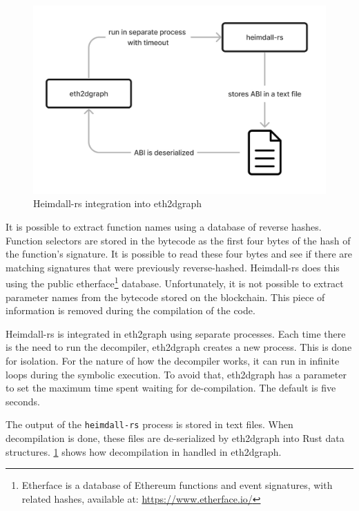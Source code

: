 \begin{figure}[!ht]
  \centering
  \includegraphics[width=1\textwidth]{Figures/methods/decompilation-architecture.jpg}
  \caption[Heimdall-rs integration into eth2dgraph]{Heimdall-rs integration into eth2dgraph}
  \label{fig:decompilation-architecture}
\end{figure}

It is possible to extract function names using a database of reverse hashes. Function selectors are stored in the bytecode as the first four bytes of the hash of the function's signature. It is possible to read these four bytes and see if there are matching signatures that were previously reverse-hashed. Heimdall-rs does this using the public etherface\footnote{Etherface is a database of Ethereum functions and event signatures, with related hashes, available at: \url{https://www.etherface.io/}} database. 
Unfortunately, it is not possible to extract parameter names from the bytecode stored on the blockchain. This piece of information is removed during the compilation of the code. 

Heimdall-rs is integrated in eth2graph using separate processes. Each time there is the need to run the decompiler, eth2dgraph creates a new process. This is done for isolation. For the nature of how the decompiler works, it can run in infinite loops during the symbolic execution. To avoid that, eth2dgraph has a parameter to set the maximum time spent waiting for de-compilation. The default is  five seconds.

The output of the {\tt heimdall-rs} process is stored in text files. When decompilation is done, these files are de-serialized by eth2dgraph into Rust data structures. \cref{fig:decompilation-architecture} shows how decompilation in handled in eth2dgraph.

